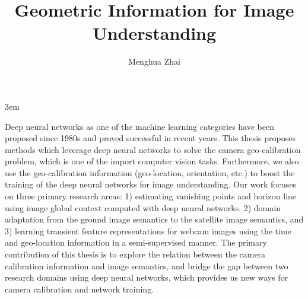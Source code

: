 \documentclass[final]{ukthesis}
\newcommand{\disstitle}{Geometric Information for Image Understanding}
\begin{document}
\emergencystretch 3em

\author{Menghua Zhai}
\title{\disstitle}

\abstract
{
  \SingleSpacing
    Deep neural networks as one of the machine learning categories have been proposed
    since 1980s and proved successful in recent years. This thesis proposes methods which
    leverage deep neural networks to solve the camera geo-calibration problem, which is
    one of the import computer vision tasks. Furthermore, we also use the geo-calibration
    information (geo-location, orientation, etc.) to boost the training of the deep neural
    networks for image understanding.
    Our work focuses on three primary research areas: 1) estimating vanishing points
    and horizon line using image global context computed with deep neural networks. 2)
    domain adaptation from the ground image semantics to the satellite image semantics,
    and 3) learning transient feature representations for webcam images using the time
    and geo-location information in a semi-supervised manner.
    The primary contribution of this thesis is to explore the relation between the
    camera calibration information and image semantics, and bridge the gap between
    two research domains using deep neural networks, which provides us new ways for
    camera calibration and network training.
}


\frontmatter
\maketitle



\tableofcontents\clearpage

\mainmatter


\backmatter




\end{document}

